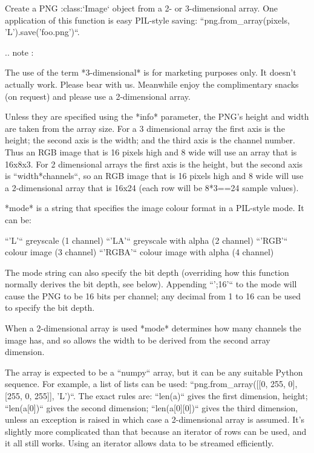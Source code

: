 \begin{DoxyVerb}Create a PNG :class:`Image` object from a 2- or 3-dimensional array.
One application of this function is easy PIL-style saving:
``png.from_array(pixels, 'L').save('foo.png')``.

.. note :

  The use of the term *3-dimensional* is for marketing purposes
  only.  It doesn't actually work.  Please bear with us.  Meanwhile
  enjoy the complimentary snacks (on request) and please use a
  2-dimensional array.

Unless they are specified using the *info* parameter, the PNG's
height and width are taken from the array size.  For a 3 dimensional
array the first axis is the height; the second axis is the width;
and the third axis is the channel number.  Thus an RGB image that is
16 pixels high and 8 wide will use an array that is 16x8x3.  For 2
dimensional arrays the first axis is the height, but the second axis
is ``width*channels``, so an RGB image that is 16 pixels high and 8
wide will use a 2-dimensional array that is 16x24 (each row will be
8*3==24 sample values).

*mode* is a string that specifies the image colour format in a
PIL-style mode.  It can be:

``'L'``
  greyscale (1 channel)
``'LA'``
  greyscale with alpha (2 channel)
``'RGB'``
  colour image (3 channel)
``'RGBA'``
  colour image with alpha (4 channel)

The mode string can also specify the bit depth (overriding how this
function normally derives the bit depth, see below).  Appending
``';16'`` to the mode will cause the PNG to be 16 bits per channel;
any decimal from 1 to 16 can be used to specify the bit depth.

When a 2-dimensional array is used *mode* determines how many
channels the image has, and so allows the width to be derived from
the second array dimension.

The array is expected to be a ``numpy`` array, but it can be any
suitable Python sequence.  For example, a list of lists can be used:
``png.from_array([[0, 255, 0], [255, 0, 255]], 'L')``.  The exact
rules are: ``len(a)`` gives the first dimension, height;
``len(a[0])`` gives the second dimension; ``len(a[0][0])`` gives the
third dimension, unless an exception is raised in which case a
2-dimensional array is assumed.  It's slightly more complicated than
that because an iterator of rows can be used, and it all still
works.  Using an iterator allows data to be streamed efficiently.


\end{DoxyVerb}
